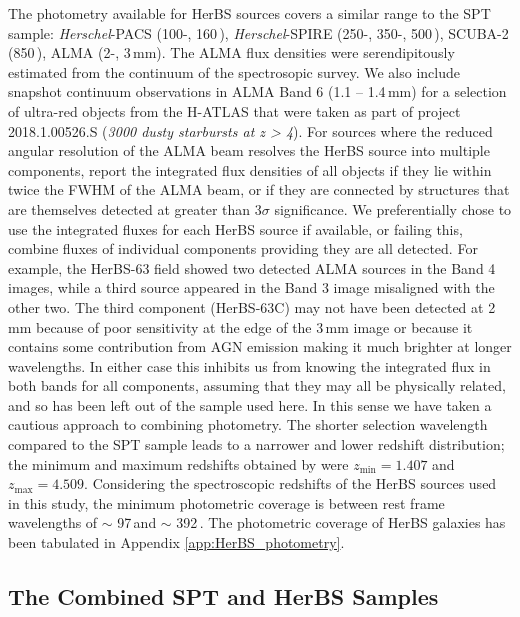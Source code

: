 The photometry available for HerBS sources covers a similar range to the SPT sample: \textit{Herschel}-PACS (100-, 160\,\micron),  \textit{Herschel}-SPIRE (250-, 350-, 500\,\micron), SCUBA-2 (850\,\micron), ALMA (2-, 3\,mm). The ALMA flux densities were serendipitously estimated from the continuum of the spectrosopic survey. We also include snapshot continuum observations in ALMA Band 6 (1.1 -- 1.4\,mm) for a selection of ultra-red objects from the H-ATLAS that were taken as part of project 2018.1.00526.S (\textit{3000 dusty starbursts at z > 4}). For sources where the reduced angular resolution of the ALMA beam resolves the HerBS source into multiple components, \citealt{Bendo_2023} report the integrated flux densities of all objects if they lie within twice the FWHM of the ALMA beam, or if they are connected by structures that are themselves detected at greater than 3$\sigma$ significance. We preferentially chose to use the integrated fluxes for each HerBS source if available, or failing this, combine fluxes of individual components providing they are all detected. For example, the HerBS-63 field showed two detected ALMA sources in the Band 4 images, while a third source appeared in the Band 3 image misaligned with the other two. The third component (HerBS-63C) may not have been detected at 2\,mm because of poor sensitivity at the edge of the 3\,mm image or because it contains some contribution from AGN emission making it much brighter at longer wavelengths. In either case this inhibits us from knowing the integrated flux in both bands for all components, assuming that they may all be physically related, and so has been left out of the sample used here. In this sense we have taken a cautious approach to combining photometry. The shorter selection wavelength compared to the SPT sample leads to a narrower and lower redshift distribution; the minimum and maximum redshifts obtained by \citealt{Urquhart_2022} were $z_{\textrm{min}} = 1.407$ and $z_{\textrm{max}} = 4.509$. Considering the spectroscopic redshifts of the HerBS sources used in this study, the minimum photometric coverage is between rest frame wavelengths of $\sim$ 97\,\micron and $\sim$ 392\,\micron. The photometric coverage of HerBS galaxies has been tabulated in Appendix \ref{app:HerBS_photometry}.

\subsection{The Combined SPT and HerBS Samples}

